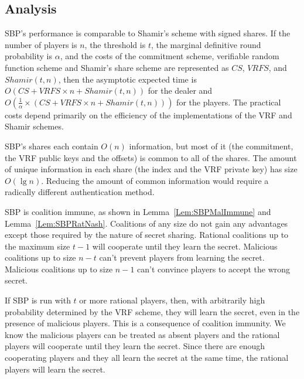 \documentclass[12pt]{dalcsthesis}
\begin{document}
\subsection{Analysis}

SBP's performance is comparable to Shamir's scheme with signed shares. If the number of players is $n$, the threshold is $t$, the marginal definitive round probability is $\alpha$, and the costs of the commitment scheme, verifiable random function scheme and Shamir's share scheme are represented as $CS$, $VRFS$, and $Shamir(t, n)$, then the asymptotic expected time is $O(CS + VRFS \times n + Shamir(t, n))$ for the dealer and $O(\frac{1}{\alpha} \times (CS + VRFS \times n + Shamir(t, n)))$ for the players. The practical costs depend primarily on the efficiency of the implementations of the VRF and Shamir schemes.

SBP's shares each contain $O(n)$ information, but most of it (the commitment, the VRF public keys and the offsets) is common to all of the shares. The amount of unique information in each share (the index and the VRF private key) has size $O(\lg n)$. Reducing the amount of common information would require a radically different authentication method.

SBP is coalition immune, as shown in Lemma~\ref{Lem:SBPMalImmune} and Lemma~\ref{Lem:SBPRatNash}. Coalitions of any size do not gain any advantages except those required by the nature of secret sharing. Rational coalitions up to the maximum size $t-1$ will cooperate until they learn the secret. Malicious coalitions up to size $n-t$ can't prevent players from learning the secret. Malicious coalitions up to size $n-1$ can't convince players to accept the wrong secret.

If SBP is run with $t$ or more rational players, then, with arbitrarily high probability determined by the VRF scheme, they will learn the secret, even in the presence of malicious players. This is a consequence of coalition immunity. We know the malicious players can be treated as absent players and the rational players will cooperate until they learn the secret. Since there are enough cooperating players and they all learn the secret at the same time, the rational players will learn the secret.
\end{document}
